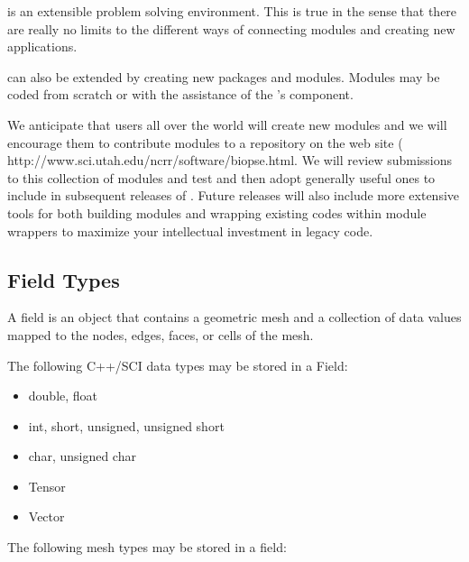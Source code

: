 \SR{} is an extensible  problem solving environment.
This is true in the sense that there are really no limits to the
different ways of connecting modules and creating new applications.  

\sr{} can also be extended by creating new packages and modules.
Modules may be coded from scratch or with the assistance of the
\sr's  component.

We anticipate that users all over the world will create new modules
and we will encourage them to contribute modules to a repository on
the \BIOPSE{} web site 
(
{http://www.sci.utah.edu/ncrr/software/biopse.html}.  We will review
submissions to this collection of modules and test and then adopt
generally useful ones to include in subsequent releases of \sr{}.
Future releases will also include more extensive tools for both
building modules and wrapping existing codes within \SR{} module
wrappers to maximize your intellectual investment in legacy code.


\subsection{Field Types}
\label{sec:field-types}


A \sr{} field is an object that contains a geometric mesh and a
collection of data values mapped to the nodes, edges, faces, or cells
of the mesh.

The following C++/SCI data types may be stored in a Field:

\begin{itemize}
\item double, float
\item int, short, unsigned, unsigned short
\item char, unsigned char
\item Tensor
\item Vector
\end{itemize}

The following mesh types may be stored in a field:

\newcommand{\meshdoc}[4]{%
  \includegraphics[0,0][100,#1]{Figures/#2.eps.gz}
  {#4}
}
\begin{htmlonly}
  \newcommand{\meshdoc}[4]{%
    \htmladdimg[align=left,alt="#3"]
    {../../Tutorial/images/figures/#2.gif}
    #4 \begin{rawhtml}<br clear="all"/>\end{rawhtml}
  }
\end{htmlonly}

